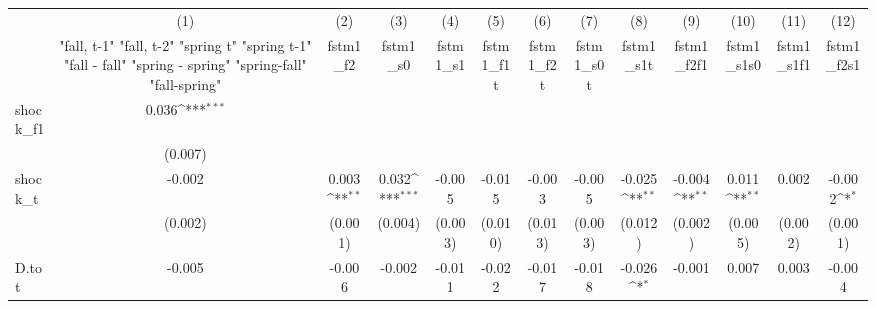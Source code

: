 {
\def\sym#1{\ifmmode^{#1}\else\(^{#1}\)\fi}
\begin{tabular}{l*{12}{c}}
\toprule
            &\multicolumn{1}{c}{(1)}&\multicolumn{1}{c}{(2)}&\multicolumn{1}{c}{(3)}&\multicolumn{1}{c}{(4)}&\multicolumn{1}{c}{(5)}&\multicolumn{1}{c}{(6)}&\multicolumn{1}{c}{(7)}&\multicolumn{1}{c}{(8)}&\multicolumn{1}{c}{(9)}&\multicolumn{1}{c}{(10)}&\multicolumn{1}{c}{(11)}&\multicolumn{1}{c}{(12)}\\
            &\multicolumn{1}{c}{  "fall, t-1" "fall, t-2" "spring t" "spring t-1"  "fall - fall" "spring - spring" "spring-fall" "fall-spring" }&\multicolumn{1}{c}{fstm1\_f2}&\multicolumn{1}{c}{fstm1\_s0}&\multicolumn{1}{c}{fstm1\_s1}&\multicolumn{1}{c}{fstm1\_f1t}&\multicolumn{1}{c}{fstm1\_f2t}&\multicolumn{1}{c}{fstm1\_s0t}&\multicolumn{1}{c}{fstm1\_s1t}&\multicolumn{1}{c}{fstm1\_f2f1}&\multicolumn{1}{c}{fstm1\_s1s0}&\multicolumn{1}{c}{fstm1\_s1f1}&\multicolumn{1}{c}{fstm1\_f2s1}\\
\midrule
shock\_f1    &       0.036\sym{***}&                     &                     &                     &                     &                     &                     &                     &                     &                     &                     &                     \\
            &     (0.007)         &                     &                     &                     &                     &                     &                     &                     &                     &                     &                     &                     \\
\addlinespace
shock\_t     &      -0.002         &       0.003\sym{**} &       0.032\sym{***}&      -0.005         &      -0.015         &      -0.003         &      -0.005         &      -0.025\sym{**} &      -0.004\sym{**} &       0.011\sym{**} &       0.002         &      -0.002\sym{*}  \\
            &     (0.002)         &     (0.001)         &     (0.004)         &     (0.003)         &     (0.010)         &     (0.013)         &     (0.003)         &     (0.012)         &     (0.002)         &     (0.005)         &     (0.002)         &     (0.001)         \\
\addlinespace
D.tot       &      -0.005         &      -0.006         &      -0.002         &      -0.011         &      -0.022         &      -0.017         &      -0.018         &      -0.026\sym{*}  &      -0.001         &       0.007         &       0.003         &      -0.004         \\

\end{tabular}}
